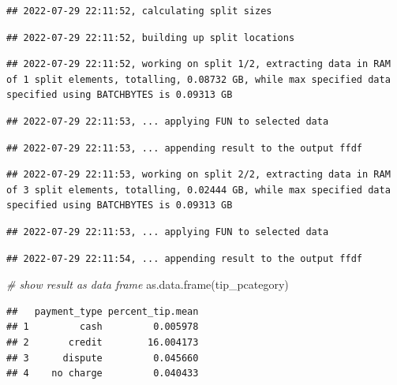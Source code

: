 \documentclass[
  12pt,
]{style/krantz}
\newenvironment{Shaded}{\begin{snugshade}}{\end{snugshade}}
\newcommand{\CommentTok}[1]{\textcolor[rgb]{0.56,0.35,0.01}{\textit{#1}}}
\newcommand{\FunctionTok}[1]{\textcolor[rgb]{0.00,0.00,0.00}{#1}}
\newcommand{\NormalTok}[1]{#1}
\begin{document}
\begin{verbatim}
## 2022-07-29 22:11:52, calculating split sizes
\end{verbatim}

\begin{verbatim}
## 2022-07-29 22:11:52, building up split locations
\end{verbatim}

\begin{verbatim}
## 2022-07-29 22:11:52, working on split 1/2, extracting data in RAM of 1 split elements, totalling, 0.08732 GB, while max specified data specified using BATCHBYTES is 0.09313 GB
\end{verbatim}

\begin{verbatim}
## 2022-07-29 22:11:53, ... applying FUN to selected data
\end{verbatim}

\begin{verbatim}
## 2022-07-29 22:11:53, ... appending result to the output ffdf
\end{verbatim}

\begin{verbatim}
## 2022-07-29 22:11:53, working on split 2/2, extracting data in RAM of 3 split elements, totalling, 0.02444 GB, while max specified data specified using BATCHBYTES is 0.09313 GB
\end{verbatim}

\begin{verbatim}
## 2022-07-29 22:11:53, ... applying FUN to selected data
\end{verbatim}

\begin{verbatim}
## 2022-07-29 22:11:54, ... appending result to the output ffdf
\end{verbatim}

\begin{Shaded}
\begin{Highlighting}[]
\CommentTok{\# show result as data frame}
\FunctionTok{as.data.frame}\NormalTok{(tip\_pcategory)}
\end{Highlighting}
\end{Shaded}

\begin{verbatim}
##   payment_type percent_tip.mean
## 1         cash         0.005978
## 2       credit        16.004173
## 3      dispute         0.045660
## 4    no charge         0.040433
\end{verbatim}
\end{document}
